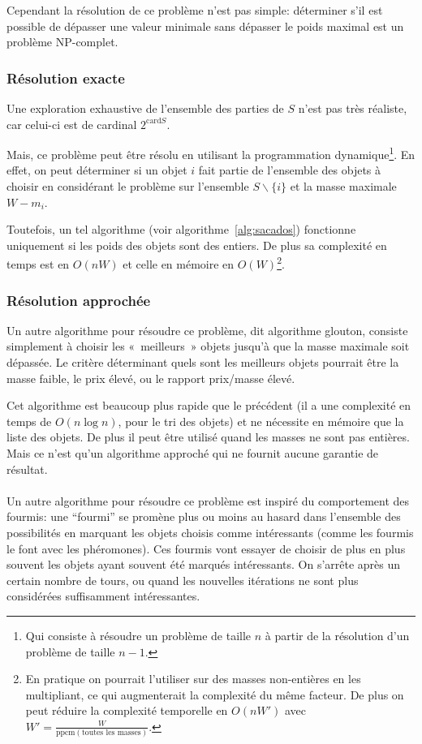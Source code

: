     Cependant la résolution de ce problème n'est pas simple: déterminer s'il
    est possible de dépasser une valeur minimale sans dépasser le poids maximal
    est un problème NP\nobreakdash-complet.

  \subsubsection{Résolution exacte}
    Une exploration exhaustive de l'ensemble des parties de $S$ n'est pas très
    réaliste, car celui-ci est de cardinal $2^{\mathrm{card} S}$.

    Mais, ce problème peut être résolu en utilisant la programmation
    dynamique\footnote{Qui consiste à résoudre un problème de taille $n$ à
    partir de la résolution d'un problème de taille $n-1$.}. En effet, on peut
    déterminer si un objet $i$ fait partie de l'ensemble des objets à choisir en
    considérant le problème sur l'ensemble $S\backslash\{i\}$ et la masse
    maximale $W-m_i$.
    
    Toutefois, un tel algorithme (voir algorithme~\ref{alg:sacados}) fonctionne
    uniquement si les poids des objets
    sont des entiers. De plus sa complexité en temps est en $O(nW)$ et celle en
    mémoire en $O(W)$\footnote{En pratique on pourrait l'utiliser sur des
    masses non-entières en les multipliant, ce qui augmenterait la complexité
    du même facteur. De plus on peut réduire la complexité temporelle en
    $O(nW')$ avec $W' = \frac W {\mathrm{ppcm}(\text{toutes les masses})}$.}.

  \subsubsection{Résolution approchée}
    Un autre algorithme pour résoudre ce problème, dit algorithme glouton,
    consiste simplement à choisir les «~meilleurs~» objets jusqu'à que la masse
    maximale soit dépassée. Le critère déterminant quels sont les meilleurs
    objets pourrait être la masse faible, le prix élevé, ou le rapport
    prix/masse élevé.

    Cet algorithme est beaucoup plus rapide que le précédent (il a une
    complexité en temps de $O(n \log n)$, pour le tri des objets) et ne
    nécessite en mémoire que la liste des objets. De plus il peut être utilisé
    quand les masses ne sont pas entières. Mais ce n'est qu'un algorithme
    approché qui ne fournit aucune garantie de résultat.


    \paragraph{}
    Un autre algorithme pour résoudre ce problème est inspiré du comportement
    des fourmis: une ``fourmi'' se promène plus ou moins au hasard dans
    l'ensemble des possibilités en marquant les objets choisis comme
    intéressants (comme les fourmis le font avec les phéromones). Ces fourmis
    vont essayer de choisir de plus en plus souvent les objets ayant souvent
    été marqués intéressants. On s'arrête après un certain nombre de tours, ou
    quand les nouvelles itérations ne sont plus considérées suffisamment
    intéressantes.

